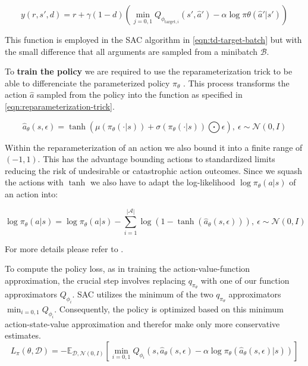 \begin{equation}\label{eqn:td-target}
	y(r, s', d) = r + \gamma(1 - d) \left(\min_{j=0,1}Q_{\phi_{\text{target}, i}}(s', \hat{a}') - \alpha \log \pi\theta(\hat{a}'| s')\right)
\end{equation} 

This function is employed in the SAC algorithm in \eqref{eqn:td-target-batch} but with the small difference that all arguments are sampled from a minibatch $\mathcal{B}$. 

To \textbf{train the policy} we are required to use the reparameterization trick to be able to differenciate the parameterized policy $\pi_\theta$ \cite{ReparameterizationTrick}.
This process transforms the action $\hat{a}$ sampled from the policy into the function as specified in \eqref{eqn:reparameterization-trick}. 

\begin{equation}\label{eqn:reparameterization-trick}
	\hat{a}_\theta(s, \epsilon) = \tanh(\mu(\pi_\theta(\cdot|s)) + \sigma(\pi_\theta(\cdot|s)) \bigodot \epsilon), \ \epsilon \sim \mathcal{N}(0, I)
\end{equation}

Within the reparameterization of an action we also bound it into a finite range of $(-1, 1)$. This has the advantage bounding actions to standardized limits reducing the risk of undesirable or catastrophic action outcomes. Since we squash the actions with $\tanh$ we also have to adapt the log-likelihood $\log \pi_\theta(a|s)$ of an action into:

\begin{equation*}
	\log \pi_\theta(a|s) = \log \pi_\theta(a|s) - \sum_{i=1}^{|\mathcal{A}|} \log(1 - \tanh(\hat{a}_\theta(s, \epsilon))), \ \epsilon \sim \mathcal{N}(0, I)
\end{equation*}

For more details please refer to \cite{SAC_Applications_Paper}.

To compute the policy loss, as in training the action-value-function approximation, the crucial step involves replacing $q_{\pi_\theta}$ with one of our function approximators $Q_{\phi_i}$. SAC utilizes the minimum of the two $q_{\pi_\theta}$ approximators $\min_{i=0,1} Q_{\phi_i}$. Consequently, the policy is optimized based on this minimum action-state-value approximation and therefor make only more conservative estimates.
\begin{equation}\label{eqn:policy-loss}
	L_\pi(\theta, \mathcal{D}) = - \mathbb{E}_{\mathcal{D}, \mathcal{N}(0, I)}\left[\min_{i=0,1}Q_{\phi_i}(s, \hat{a}_\theta(s, \epsilon) - \alpha \log \pi_\theta(\hat{a}_\theta(s, \epsilon)| s))\right]
\end{equation}

